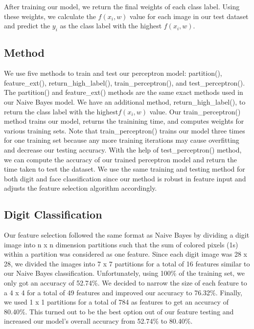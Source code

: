 \documentclass[10pt,parskip=half,
toc=sectionentrywithdots,
bibliography=totocnumbered,
captions=tableheading,numbers=noendperiod]{scrartcl}
\begin{document}
After training our model, we return the final weights of each class
label. Using these weights, we calculate the \(f(x_i,w)\) value for each
image in our test dataset and predict the \(y_i\) as the class label
with the highest \(f(x_i,w)\).

\hypertarget{method}{%
\subsection{Method}\label{method}}

We use five methods to train and test our perceptron model: partition(),
feature\_ext(), return\_high\_label(), train\_perceptron(), and
test\_perceptron(). The partition() and feature\_ext() methods are the
same exact methods used in our Naive Bayes model. We have an additional
method, return\_high\_label(), to return the class label with the
highest\(f(x_i,w)\) value. Our train\_perceptron() method trains our
model, returns the trainining time, and computes weights for various
training sets. Note that train\_perceptron() trains our model three
times for one training set because any more training iterations may
cause overfitting and decrease our testing accuracy. With the help of
test\_perceptron() method, we can compute the accuracy of our trained
perceptron model and return the time taken to test the dataset. We use
the same training and testing method for both digit and face
classification since our method is robust in feature input and adjusts
the feature selection algorithm accordingly.

\hypertarget{digit-classification}{%
\subsection{Digit Classification}\label{digit-classification}}

Our feature selection followed the same format as Naive Bayes by
dividing a digit image into n x n dimension partitions such that the sum
of colored pixels (1s) within a partition was considered as one feature.
Since each digit image was 28 x 28, we divided the images into 7 x 7
partitions for a total of 16 features similar to our Naive Bayes
classification. Unfortunately, using 100\% of the training set, we only
got an accuracy of 52.74\%. We decided to narrow the size of each
feature to a 4 x 4 for a total of 49 features and improved our accuracy
to 76.32\%. Finally, we used 1 x 1 partitions for a total of 784 as
features to get an accuracy of 80.40\%. This turned out to be the best
option out of our feature testing and increased our model's overall
accuracy from 52.74\% to 80.40\%.
\end{document}
